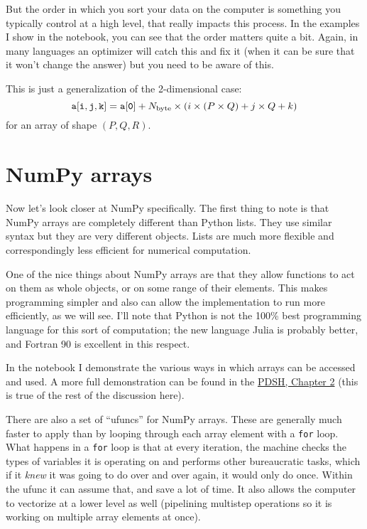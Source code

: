 But the order in which you sort your data on the computer is something
you typically control at a high level, that really impacts this
process. In the examples I show in the notebook, you can see that the
order matters quite a bit. Again, in many languages an optimizer will
catch this and fix it (when it can be sure that it won't change the
answer) but you need to be aware of this.


\begin{answer}
This is just a generalization of the 2-dimensional case:
\begin{equation}
  {\tt a[i, j, k]} = {\tt a[0]} + N_{\rm byte} \times (i \times (P
  \times Q) + j \times Q + k)
\end{equation}
for an array of shape $(P, Q, R)$.
\end{answer}

\section{NumPy arrays}

Now let's look closer at NumPy specifically. The first thing to note
is that NumPy arrays are completely different than Python lists. They
use similar syntax but they are very different objects. Lists are much
more flexible and correspondingly less efficient for numerical
computation.

One of the nice things about NumPy arrays are that they allow
functions to act on them as whole objects, or on some range of their
elements. This makes programming simpler and also can allow the
implementation to run more efficiently, as we will see. I'll note that
Python is not the 100\% best programming language for this sort of
computation; the new language Julia is probably better, and Fortran 90
is excellent in this respect. 

In the notebook I demonstrate the various ways in which arrays can be
accessed and used. A more full demonstration can be found in the
\href{https://github.com/jakevdp/PythonDataScienceHandbook/tree/de0cc6bd317012d50ab3dd06e3cf4e256de1973f/notebooks}{PDSH,
  Chapter 2} (this is true of the rest of the discussion here).

There are also a set of ``ufuncs'' for NumPy arrays. These are
generally much faster to apply than by looping through each array
element with a {\tt for} loop. What happens in a {\tt for} loop is
that at every iteration, the machine checks the types of variables it
is operating on and performs other bureaucratic tasks, which if it
{\it knew} it was going to do over and over again, it would only do
once. Within the ufunc it can assume that, and save a lot of time. It
also allows the computer to vectorize at a lower level as well
(pipelining multistep operations so it is working on multiple array
elements at once). 

